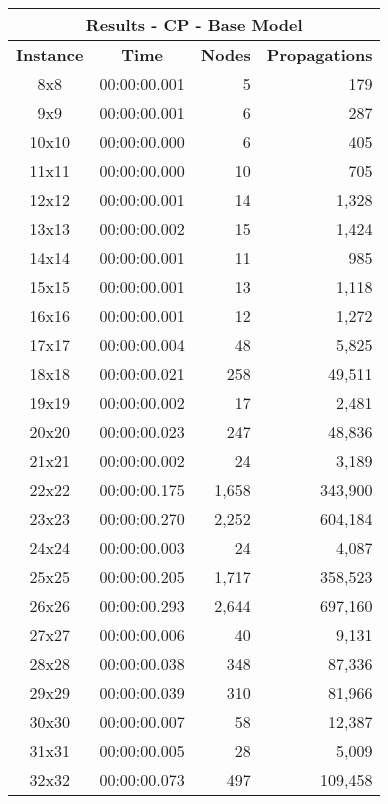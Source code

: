 
\begin{center}
    \begin{tabular}{|c|c|r|r|}
        \hline
        \multicolumn{4}{|c|}{\textbf{Results - CP - Base Model}} \\
        \hline
        \textbf{Instance} & \textbf{Time} & \textbf{Nodes} & \textbf{Propagations} \\
        
        \hline
		8x8 & 00:00:00.001 & 5 & 179 \\ \hline
		9x9 & 00:00:00.001 & 6 & 287 \\ \hline
		10x10 & 00:00:00.000 & 6 & 405 \\ \hline
		11x11 & 00:00:00.000 & 10 & 705 \\ \hline
		12x12 & 00:00:00.001 & 14 & 1,328 \\ \hline
		13x13 & 00:00:00.002 & 15 & 1,424 \\ \hline
		14x14 & 00:00:00.001 & 11 & 985 \\ \hline
		15x15 & 00:00:00.001 & 13 & 1,118 \\ \hline
		16x16 & 00:00:00.001 & 12 & 1,272 \\ \hline
		17x17 & 00:00:00.004 & 48 & 5,825 \\ \hline
		18x18 & 00:00:00.021 & 258 & 49,511 \\ \hline
		19x19 & 00:00:00.002 & 17 & 2,481 \\ \hline
		20x20 & 00:00:00.023 & 247 & 48,836 \\ \hline
		21x21 & 00:00:00.002 & 24 & 3,189 \\ \hline
		22x22 & 00:00:00.175 & 1,658 & 343,900 \\ \hline
		23x23 & 00:00:00.270 & 2,252 & 604,184 \\ \hline
		24x24 & 00:00:00.003 & 24 & 4,087 \\ \hline
		25x25 & 00:00:00.205 & 1,717 & 358,523 \\ \hline
		26x26 & 00:00:00.293 & 2,644 & 697,160 \\ \hline
		27x27 & 00:00:00.006 & 40 & 9,131 \\ \hline
		28x28 & 00:00:00.038 & 348 & 87,336 \\ \hline
		29x29 & 00:00:00.039 & 310 & 81,966 \\ \hline
		30x30 & 00:00:00.007 & 58 & 12,387 \\ \hline
		31x31 & 00:00:00.005 & 28 & 5,009 \\ \hline
		32x32 & 00:00:00.073 & 497 & 109,458 \\ \hline

\end{tabular}
\end{center}
